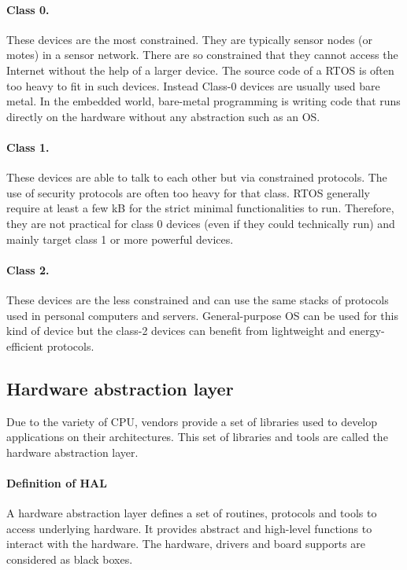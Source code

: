 \paragraph{Class 0.}
These devices are the most constrained.
They are typically sensor nodes (or motes) in a sensor network.
There are so constrained that they cannot access the Internet without the help of a larger device.
The source code of a RTOS is often too heavy to fit in such devices.
Instead Class-0 devices are usually used bare metal.
In the embedded world, bare-metal programming is writing code that runs directly on the hardware without any abstraction such as an OS.

\paragraph{Class 1.}
These devices are able to talk to each other but via constrained protocols.
The use of security protocols are often too heavy for that class.
RTOS generally require at least a few kB for the strict minimal functionalities to run.
Therefore, they are not practical for class 0 devices (even if they could technically run) and mainly target class 1 or more powerful devices.


\paragraph{Class 2.}
These devices are the less constrained and can use the same stacks of protocols used in personal computers and servers.
General-purpose OS can be used for this kind of device but the class-2 devices can benefit from lightweight and energy-efficient protocols.

\subsection{Hardware abstraction layer}

Due to the variety of CPU, vendors provide a set of libraries used to develop applications on their architectures.
This set of libraries and tools are called the hardware abstraction layer.

\paragraph{Definition of HAL}
A hardware abstraction layer defines a set of routines, protocols and tools to access underlying hardware.
It provides abstract and high-level functions to interact with the hardware.
The hardware, drivers and board supports are considered as black boxes.

